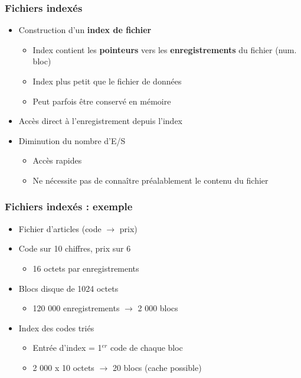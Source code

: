 \begin{frame}
\frametitle{Fichiers indexés}
\begin{itemize}
\item Construction d'un \textbf{index de fichier}
\begin{itemize}
\item Index contient les \textbf{pointeurs} vers les \textbf{enregistrements} du fichier (num. bloc)
\item Index plus petit que le fichier de données
\item Peut parfois être conservé en mémoire
\end{itemize}

\item Accès direct à l'enregistrement depuis l’index
\item Diminution du nombre d'E/S
\begin{itemize}
\item Accès rapides
\item Ne nécessite pas de connaître préalablement le contenu du fichier
\end{itemize}
\end{itemize}
\end{frame}

\begin{frame}
\frametitle{Fichiers indexés : exemple}
\begin{itemize}
\item Fichier d'articles (code $\rightarrow$ prix)
\item Code sur 10 chiffres, prix sur 6
\begin{itemize}
\item 16 octets par enregistrements
\end{itemize}
\item Blocs disque de 1024 octets
\begin{itemize}
\item 120 000 enregistrements $\rightarrow$ 2 000 blocs
\end{itemize}
\item Index des codes triés
\begin{itemize}
\item Entrée d'index = 1$^{er}$ code de chaque bloc
\item 2 000 x 10 octets $\rightarrow$ 20 blocs (cache possible)
\end{itemize}
\end{itemize}
\end{frame}

